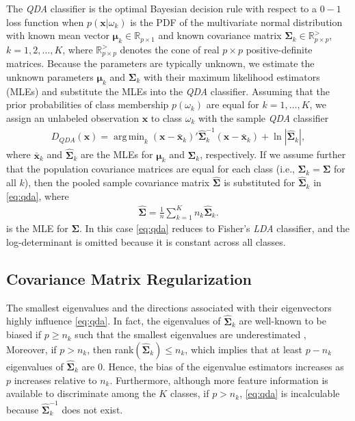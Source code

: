 \documentclass[11pt]{article}
\newcommand{\xbar}{\bar{\bm x}}
\DeclareMathOperator*{\argmin}{arg\,min}
\begin{document}
The \emph{QDA} classifier is the optimal Bayesian decision rule with respect to a $0-1$ loss function when $p(\bm x | \omega_k)$ is the PDF of the multivariate normal distribution with known mean vector  $\bm\mu_k \in \mathbb{R}_{p \times 1}$ and known covariance matrix $\bm\Sigma_k \in \mathbb{R}_{p \times p}^{>}$, $k = 1, 2, \ldots, K$, where $\mathbb{R}_{p \times p}^{>}$ denotes the cone of real $p \times p$ positive-definite matrices. Because the parameters are typically unknown, we estimate the unknown parameters $\bm \mu_k$ and $\bm\Sigma_k$ with their maximum likelihood estimators (MLEs) and substitute the MLEs into the \emph{QDA} classifier. Assuming that the prior probabilities of class membership $p(\omega_k)$ are equal for $k = 1, \ldots, K$, we assign an unlabeled observation $\bm x$ to class $\omega_k$ with the sample \emph{QDA} classifier
\begin{align}
	D_{QDA}(\bm x) = \argmin_{k}  (\bm x - \xbar_k)'\widehat{\bm\Sigma}_k^{-1}(\bm x - \xbar_k)  + \ln |\widehat{\bm\Sigma}_k|, \label{eq:qda}
\end{align}
where $\xbar_k$ and $\widehat{\bm\Sigma}_k$ are the MLEs for $\bm \mu_k$ and $\bm \Sigma_k$, respectively. If we assume further that the population covariance matrices are equal for each class (i.e., $\bm\Sigma_k = \bm\Sigma$ for all $k$), then the pooled sample covariance matrix $\widehat{\bm\Sigma}$ is substituted for $\widehat{\bm \Sigma}_k$ in \eqref{eq:qda}, where
\begin{align}
	\widehat{\bm\Sigma} = \frac{1}{n} \sum_{k=1}^K n_k \widehat{\bm\Sigma}_k. \label{eq:pooled-cov}
\end{align}
is the MLE for $\bm \Sigma$. In this case \eqref{eq:qda} reduces to Fisher's \emph{LDA} classifier, and the log-determinant is omitted because it is constant across all classes.

\subsection{Covariance Matrix Regularization}

The smallest eigenvalues and the directions associated with their eigenvectors highly influence \eqref{eq:qda}. In fact, the eigenvalues of $\widehat{\bm \Sigma}_k$ are well-known to be biased if $p \ge n_k$ such that the smallest eigenvalues are underestimated \citep{Seber:2004uh}, Moreover, if $p > n_k$, then rank$(\widehat{\bm \Sigma}_k) \le n_k$, which implies that at least $p - n_k$ eigenvalues of $\widehat{\bm \Sigma}_k$ are 0. Hence, the bias of the eigenvalue estimators increases as $p$ increases relative to $n_k$. Furthermore, although more feature information is available to discriminate among the $K$ classes, if $p > n_k$, \eqref{eq:qda} is incalculable because $\widehat{\bm \Sigma}_k^{-1}$ does not exist.
\end{document}

